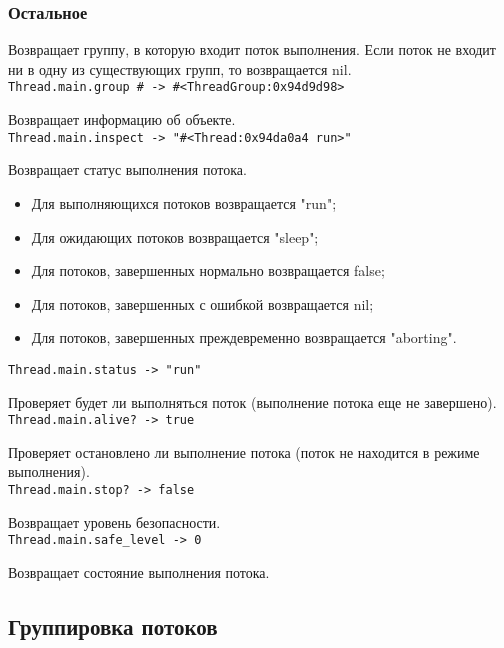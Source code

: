 \subsubsection*{Остальное}

\begin{methodlist}
  Возвращает группу, в которую входит поток выполнения. Если поток не входит ни в одну из существующих групп, то возвращается nil.
  \\\verb!Thread.main.group # -> #<ThreadGroup:0x94d9d98>!

  Возвращает информацию об объекте. 
  \\\verb!Thread.main.inspect -> "#<Thread:0x94da0a4 run>"!

  Возвращает статус выполнения потока.
  \begin{itemize}
    \item Для выполняющихся потоков возвращается "run";
    \item Для ожидающих потоков возвращается "sleep";
    \item Для потоков, завершенных нормально возвращается false;
    \item Для потоков, завершенных с ошибкой возвращается nil;
    \item Для потоков, завершенных преждевременно возвращается "aborting".
  \end{itemize}   
  \verb!Thread.main.status -> "run"!

  Проверяет будет ли выполняться поток (выполнение потока еще не завершено).
  \\\verb!Thread.main.alive? -> true!

  Проверяет остановлено ли выполнение потока (поток не находится в режиме выполнения). 
  \\\verb!Thread.main.stop? -> false!
 
  Возвращает уровень безопасности. 
  \\\verb!Thread.main.safe_level -> 0!

  Возвращает состояние выполнения потока.
\end{methodlist}

\subsection{Группировка потоков}

